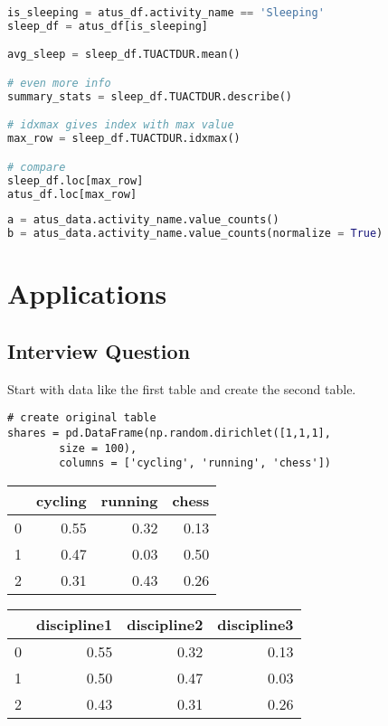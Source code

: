 \begin{lstlisting}[language = Python]
is_sleeping = atus_df.activity_name == 'Sleeping'
sleep_df = atus_df[is_sleeping]

avg_sleep = sleep_df.TUACTDUR.mean()

# even more info 
summary_stats = sleep_df.TUACTDUR.describe()

# idxmax gives index with max value
max_row = sleep_df.TUACTDUR.idxmax()

# compare 
sleep_df.loc[max_row]
atus_df.loc[max_row]
\end{lstlisting}



\begin{lstlisting}[language = Python]
a = atus_data.activity_name.value_counts()
b = atus_data.activity_name.value_counts(normalize = True)
\end{lstlisting}


\section{Applications}

\subsection{Interview Question}

Start with data like the first table and create the second table. 

\begin{lstlisting}
# create original table
shares = pd.DataFrame(np.random.dirichlet([1,1,1], 
        size = 100), 
        columns = ['cycling', 'running', 'chess'])
\end{lstlisting}
\medskip

\begin{tabular}{lrrr}
\toprule
{} &  cycling &  running &  chess \\
\midrule
0 &     0.55 &     0.32 &   0.13 \\
1 &     0.47 &     0.03 &   0.50 \\
2 &     0.31 &     0.43 &   0.26 \\
\bottomrule
\end{tabular}

\medskip

\begin{tabular}{lrrr}
\toprule
{} &  discipline1 &  discipline2 &  discipline3 \\
\midrule
0 &   0.55 &     0.32 &     0.13 \\
1 &   0.50 &     0.47 &     0.03 \\
2 &   0.43 &     0.31 &     0.26 \\
\bottomrule
\end{tabular}

